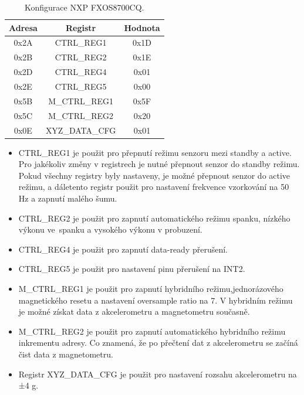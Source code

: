 \begin{table}[!h]
    \centering
    \begin{tabular}{|c|c|c|}
        \hline
        \textbf{Adresa} & \textbf{Registr} & \textbf{Hodnota} \\
        \hline
        0x2A            & CTRL\_REG1       & 0x1D             \\
        0x2B            & CTRL\_REG2       & 0x1E             \\
        0x2D            & CTRL\_REG4       & 0x01             \\
        0x2E            & CTRL\_REG5       & 0x00             \\
        0x5B            & M\_CTRL\_REG1    & 0x5F             \\
        0x5C            & M\_CTRL\_REG2    & 0x20             \\
        0x0E            & XYZ\_DATA\_CFG   & 0x01             \\
        \hline
    \end{tabular}
    \caption{Konfigurace NXP FXOS8700CQ\cite{FXOS8700CQ}.}
    \label{tab:FXOS8700CQ}
\end{table}

\begin{itemize}
    \item CTRL\_REG1 je použit pro přepnutí režimu senzoru mezi standby a active. Pro jakékoliv změny v registrech je nutné přepnout senzor do standby režimu. Pokud všechny registry byly nastaveny, je možné přepnout senzor do active režimu, a dáletento registr použit pro nastavení frekvence vzorkování na 50 Hz a zapnutí malého šumu.
    \item CTRL\_REG2 je použit pro zapnutí automatického režimu spanku, nízkého výkonu ve~spanku a vysokého výkonu v probuzení.

    \item CTRL\_REG4 je použit pro zapnutí data-ready přerušení.

    \item CTRL\_REG5 je použit pro nastavení pinu přerušení na INT2.

    \item M\_CTRL\_REG1 je použit pro zapnutí hybridního režimu,jednorázového magnetického resetu a nastavení oversample ratio na 7. V hybridním režimu je možné získat data z akcelerometru a magnetometru současně.

    \item M\_CTRL\_REG2 je použit pro zapnutí automatického hybridního režimu inkrementu adresy. Co znamená, že po přečtení dat z akcelerometru se začíná čist data z magnetometru.

    \item Registr XYZ\_DATA\_CFG je použit pro nastavení rozsahu akcelerometru na ±4 g\cite{FXOS8700CQ}.
\end{itemize}


